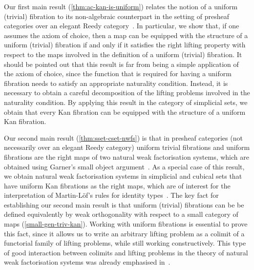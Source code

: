 \documentclass[reqno,10pt,a4paper,oneside,draft]{amsart}
\begin{document}
Our first main result (\cref{thm:ac-kan-is-uniform}) relates the notion of a uniform (trivial) fibration to its non-algebraic counterpart
in the setting of presheaf categories over an elegant Reedy category~\cite{bergner-rezk-elegant}. 
In particular, we show that, if one assumes the axiom of choice, then a map can be equipped with the structure of a uniform (trivial) fibration if and only if it satisfies the right lifting property with respect to the maps involved in the definition of a uniform (trivial)
fibration. 
It should be pointed out that this result is far from being a simple application of the axiom of choice, since the function that is
required for having a uniform fibration needs to satisfy an appropriate naturality condition. Instead, it is necessary to 
obtain a careful decomposition of the lifting problems involved in the naturality condition.
By applying this result in the category of simplicial sets, we obtain that every Kan fibration can be equipped with the structure of a uniform Kan fibration.

Our second main result (\cref{thm:sset-cset-nwfs}) is that in presheaf categories (not necessarily over an elegant Reedy category) uniform trivial fibrations and uniform fibrations are the right maps of two natural weak factorisation systems, which are obtained using Garner's small object argument~\cite{garner:small-object-argument}.
As a special case of this result, we obtain natural weak factorisation systems in simplicial and cubical sets that have uniform Kan fibrations as the right maps, which are of interest for the interpretation of Martin-L\"of's rules for identity 
types~\cite{awodey-warren:homotopy-idtype,gambino-garner:idtypewfs,warren:thesis,garner:topological-simplicial,shulman:inverse-diagrams}.
The key fact for establishing our second main result is that uniform (trivial) fibrations can be be defined equivalently by weak orthogonality with respect to a small category of maps (\cref{small-gen-triv-kan}).
Working with uniform fibrations is essential to prove this fact, since it allows us to write an arbitrary lifting problem as a colimit of a functorial family of lifting problems, while still working constructively.
This type of good interaction between colimits and lifting problems in the theory of natural weak factorisation systems was already emphasised in~\cite{riehl-cat-homotopy}.
\end{document}
